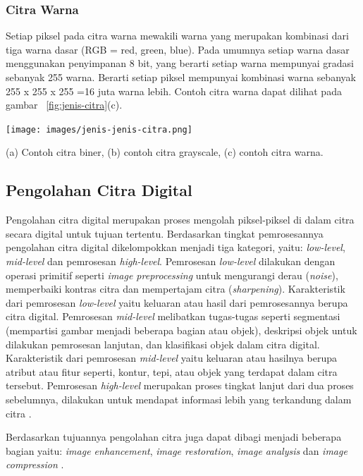 \subsubsection{Citra Warna} 
Setiap piksel pada citra warna mewakili warna yang merupakan kombinasi dari tiga warna dasar (RGB = red, green, blue). Pada umumnya setiap warna dasar menggunakan penyimpanan 8 bit, yang berarti setiap warna mempunyai gradasi sebanyak 255 warna. Berarti setiap piksel mempunyai kombinasi warna sebanyak 255 x 255 x 255 =16 juta warna lebih. Contoh citra warna dapat dilihat pada gambar ~\ref{fig:jenis-citra}(c).

\begin{afigure}
    \texttt{[image: images/jenis-jenis-citra.png]}
    \caption{(a) Contoh citra biner, (b) contoh citra grayscale, (c) contoh citra warna.}
    \label{fig:jenis-citra}
\end{afigure}


\subsection{Pengolahan Citra Digital}
Pengolahan citra digital merupakan proses mengolah piksel-piksel di dalam citra secara digital untuk tujuan tertentu. Berdasarkan tingkat pemrosesannya pengolahan citra digital dikelompokkan menjadi tiga kategori, yaitu: \textit{low-level}, \textit{mid-level} dan pemrosesan \textit{high-level}. Pemrosesan \textit{low-level} dilakukan dengan operasi primitif seperti \textit{image preprocessing} untuk mengurangi derau (\textit{noise}), memperbaiki kontras citra dan mempertajam citra (\textit{sharpening}). Karakteristik dari pemrosesan \textit{low-level} yaitu keluaran atau hasil dari pemrosesannya berupa citra digital. Pemrosesan \textit{mid-level} melibatkan tugas-tugas seperti segmentasi (mempartisi gambar menjadi beberapa bagian atau objek), deskripsi objek untuk dilakukan pemrosesan lanjutan, dan klasifikasi objek dalam citra digital. Karakteristik dari pemrosesan \textit{mid-level} yaitu keluaran atau hasilnya berupa atribut atau fitur seperti, kontur, tepi, atau objek yang terdapat dalam citra tersebut. Pemrosesan \textit{high-level} merupakan proses tingkat lanjut dari dua proses sebelumnya, dilakukan untuk mendapat informasi lebih yang terkandung dalam citra .

Berdasarkan tujuannya pengolahan citra juga dapat dibagi menjadi beberapa bagian yaitu: \textit{image enhancement}, \textit{image restoration}, \textit{image analysis} dan \textit{image compression} .

